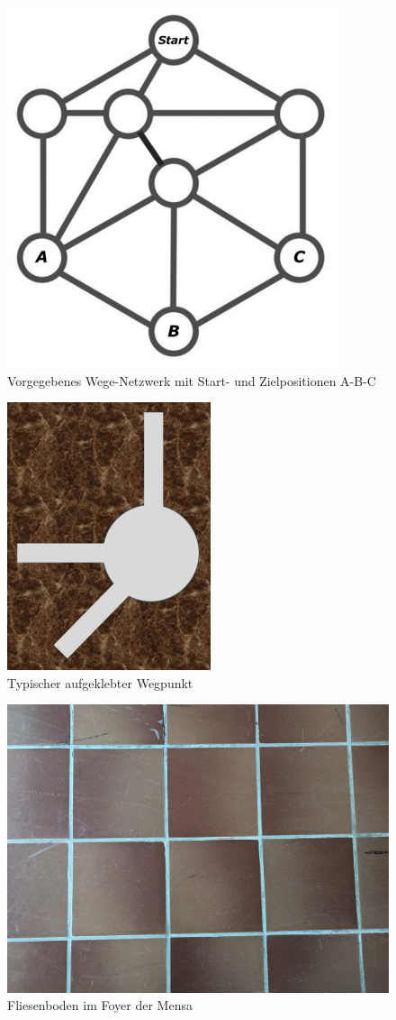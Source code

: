 \documentclass[../main.tex]{subfiles}
\begin{document}
\begin{figure} [ht]
  \centering
  \includegraphics[scale=0.5]{../resources/WegeNetzwerk.png}
  \caption{Vorgegebenes Wege-Netzwerk mit Start- und Zielpositionen A-B-C}
  \label{fig:wege-netzwerk}
\end{figure}

\begin{figure} [ht]
  \centering
  \includegraphics[scale=0.5]{../resources/Wegpunkt.png}
  \caption{Typischer aufgeklebter Wegpunkt}
  \label{fig:wegpunkt}
\end{figure}

\begin{figure} [ht]
  \centering
  \includegraphics[scale=0.05]{../resources/Fliesenboden.jpg}
  \caption{Fliesenboden im Foyer der Mensa}
  \label{fig:fliesenboden}
\end{figure}

\newpage
\end{document}
